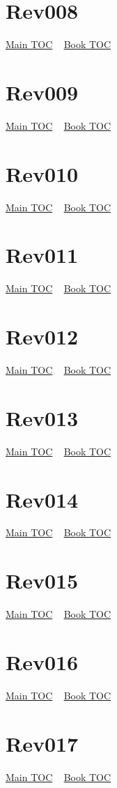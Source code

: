 \documentclass{book}
\begin{document}
  \section{Rev008}\hyperlink{toc}{Main TOC} ~ \hyperref[subsec:Rev]{Book TOC} 
  \section{Rev009}\hyperlink{toc}{Main TOC} ~ \hyperref[subsec:Rev]{Book TOC} 
  \section{Rev010}\hyperlink{toc}{Main TOC} ~ \hyperref[subsec:Rev]{Book TOC} 
  \section{Rev011}\hyperlink{toc}{Main TOC} ~ \hyperref[subsec:Rev]{Book TOC} 
  \section{Rev012}\hyperlink{toc}{Main TOC} ~ \hyperref[subsec:Rev]{Book TOC} 
  \section{Rev013}\hyperlink{toc}{Main TOC} ~ \hyperref[subsec:Rev]{Book TOC} 
  \section{Rev014}\hyperlink{toc}{Main TOC} ~ \hyperref[subsec:Rev]{Book TOC} 
  \section{Rev015}\hyperlink{toc}{Main TOC} ~ \hyperref[subsec:Rev]{Book TOC} 
  \section{Rev016}\hyperlink{toc}{Main TOC} ~ \hyperref[subsec:Rev]{Book TOC} 
  \section{Rev017}\hyperlink{toc}{Main TOC} ~ \hyperref[subsec:Rev]{Book TOC} 
\end{document}
